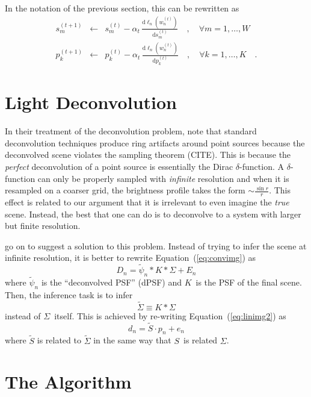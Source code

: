 \documentclass[12pt,preprint]{aastex}
\newcommand{\Eq}[1]{Equation~(\ref{eq:#1})}
\newcommand{\eq}[1]{\Eq{#1}}
\newcommand{\dd}{\mathrm{d}}
\newcommand{\data}{\ensuremath{D}}
\newcommand{\scene}{\ensuremath{\Sigma}}
\newcommand{\kernel}{\ensuremath{K}}
\newcommand{\dpsf}{\ensuremath{\tilde{\psi}}}
\newcommand{\dvec}{\ensuremath{d}}
\newcommand{\evec}{\ensuremath{e}}
\newcommand{\svec}{\ensuremath{s}}
\newcommand{\smat}{\ensuremath{S}}
\newcommand{\pvec}{\ensuremath{p}}
\begin{document}
In the notation of the previous section, this can be rewritten as
\begin{eqnarray}
    \svec^{(t+1)}_m &\gets& \svec^{(t)}_m - \alpha_t \,
    \frac{\dd \ell_n (w_n^{(t)})}{\dd \svec_m^{(t)}} \quad, \quad
    \forall m = 1,\ldots,W \\
    \pvec^{(t+1)}_k &\gets& \pvec^{(t)}_k - \alpha_t \,
    \frac{\dd \ell_n (w_n^{(t)})}{\dd \pvec_k^{(t)}} \quad, \quad
    \forall k = 1,\ldots,K \quad.
\end{eqnarray}

\section{Light Deconvolution}

In their treatment of the deconvolution problem, \citet{magain} note that
standard deconvolution techniques produce ring artifacts around point
sources because the deconvolved scene violates the sampling theorem (CITE).
This is because the \emph{perfect} deconvolution of a point source is
essentially the Dirac $\delta$-function. A $\delta$-function can only be
properly sampled with \emph{infinite} resolution and when it is resampled
on a coarser grid, the brightness profile takes the form
$\sim \frac{\sin r}{r}$. This effect is related to our argument that it
is irrelevant to even imagine the \emph{true} scene. Instead, the best
that one can do is to deconvolve to a system with larger but finite
resolution.

\citet{magain} go on to suggest a solution to this problem. Instead of
trying to infer the scene at infinite resolution, it is better to rewrite
\eq{convimg} as
\begin{equation}
    \data_n = \dpsf_n \ast \kernel \ast \scene + E_n
\end{equation}
where $\dpsf_n$ is the ``deconvolved PSF'' (dPSF) and \kernel\ is the
PSF of the final scene. Then, the inference task is to infer
\begin{equation}
    \tilde{\scene} \equiv \kernel \ast \scene
\end{equation}
instead of \scene\ itself. This is achieved by re-writing \eq{linimg2} as
\begin{equation}
    \dvec_n = \tilde{\smat} \cdot \pvec_n + \evec_n
\end{equation}
where $\tilde{\smat}$ is related to $\tilde{\scene}$ in the same way that
\smat\ is related \scene.

\section{The Algorithm}
\end{document}
